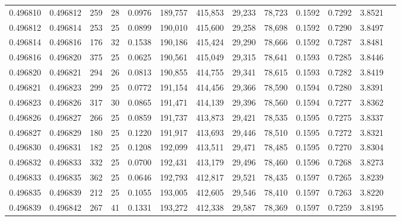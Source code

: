 \begin{tabular}{rrrrrrrrrrrrr}
0.496810 & 0.496812 & 259 &  28 &                                     0.0976 & 189,757 & 415,853 &  29,233 &  78,723 & 0.1592 & 0.7292 & 3.8521 \\
0.496812 & 0.496814 & 253 &  25 &                                     0.0899 & 190,010 & 415,600 &  29,258 &  78,698 & 0.1592 & 0.7290 & 3.8497 \\
0.496814 & 0.496816 & 176 &  32 &                                     0.1538 & 190,186 & 415,424 &  29,290 &  78,666 & 0.1592 & 0.7287 & 3.8481 \\
0.496816 & 0.496820 & 375 &  25 &                                     0.0625 & 190,561 & 415,049 &  29,315 &  78,641 & 0.1593 & 0.7285 & 3.8446 \\
0.496820 & 0.496821 & 294 &  26 &                                     0.0813 & 190,855 & 414,755 &  29,341 &  78,615 & 0.1593 & 0.7282 & 3.8419 \\
0.496821 & 0.496823 & 299 &  25 &                                     0.0772 & 191,154 & 414,456 &  29,366 &  78,590 & 0.1594 & 0.7280 & 3.8391 \\
0.496823 & 0.496826 & 317 &  30 &                                     0.0865 & 191,471 & 414,139 &  29,396 &  78,560 & 0.1594 & 0.7277 & 3.8362 \\
0.496826 & 0.496827 & 266 &  25 &                                     0.0859 & 191,737 & 413,873 &  29,421 &  78,535 & 0.1595 & 0.7275 & 3.8337 \\
0.496827 & 0.496829 & 180 &  25 &                                     0.1220 & 191,917 & 413,693 &  29,446 &  78,510 & 0.1595 & 0.7272 & 3.8321 \\
0.496830 & 0.496831 & 182 &  25 &                                     0.1208 & 192,099 & 413,511 &  29,471 &  78,485 & 0.1595 & 0.7270 & 3.8304 \\
0.496832 & 0.496833 & 332 &  25 &                                     0.0700 & 192,431 & 413,179 &  29,496 &  78,460 & 0.1596 & 0.7268 & 3.8273 \\
0.496833 & 0.496835 & 362 &  25 &                                     0.0646 & 192,793 & 412,817 &  29,521 &  78,435 & 0.1597 & 0.7265 & 3.8239 \\
0.496835 & 0.496839 & 212 &  25 &                                     0.1055 & 193,005 & 412,605 &  29,546 &  78,410 & 0.1597 & 0.7263 & 3.8220 \\
0.496839 & 0.496842 & 267 &  41 &                                     0.1331 & 193,272 & 412,338 &  29,587 &  78,369 & 0.1597 & 0.7259 & 3.8195 \\

\end{tabular}
